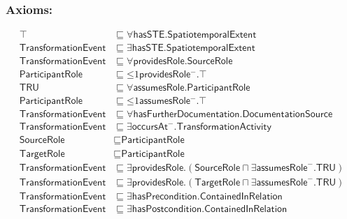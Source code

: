 \subsubsection*{Axioms:}
\begin{align}
\top &\sqsubseteq \forall\textsf{hasSTE.SpatiotemporalExtent}\\
\textsf{TransformationEvent} &\sqsubseteq \exists\textsf{hasSTE.SpatiotemporalExtent}\\
\textsf{TransformationEvent} &\sqsubseteq \forall\textsf{providesRole.SourceRole}\\
\textsf{ParticipantRole} &\sqsubseteq \mathord{\leq} 1 \textsf{providesRole}\mathord{^-}.\top\\
\textsf{TRU} &\sqsubseteq \forall\textsf{assumesRole.ParticipantRole}\\
\textsf{ParticipantRole} &\sqsubseteq \mathord{\leq} 1 \textsf{assumesRole}\mathord{^-}.\top\\
\textsf{TransformationEvent} &\sqsubseteq \forall\textsf{hasFurtherDocumentation.DocumentationSource} \\
\textsf{TransformationEvent} &\sqsubseteq \exists\textsf{occursAt}^-.\textsf{TransformationActivity}\\
\textsf{SourceRole} &\sqsubseteq \textsf{ParticipantRole}\\
\textsf{TargetRole} &\sqsubseteq \textsf{ParticipantRole}\\
\textsf{TransformationEvent} &\sqsubseteq \exists\textsf{providesRole}.(\textsf{SourceRole} \sqcap \exists \textsf{assumesRole}^-.\textsf{TRU})\\
\textsf{TransformationEvent} &\sqsubseteq \exists\textsf{providesRole}.(\textsf{TargetRole} \sqcap \exists \textsf{assumesRole}^-.\textsf{TRU})\\
\textsf{TransformationEvent} &\sqsubseteq \exists\textsf{hasPrecondition.ContainedInRelation}\\
\textsf{TransformationEvent} &\sqsubseteq \exists\textsf{hasPostcondition.ContainedInRelation}
\end{align}

